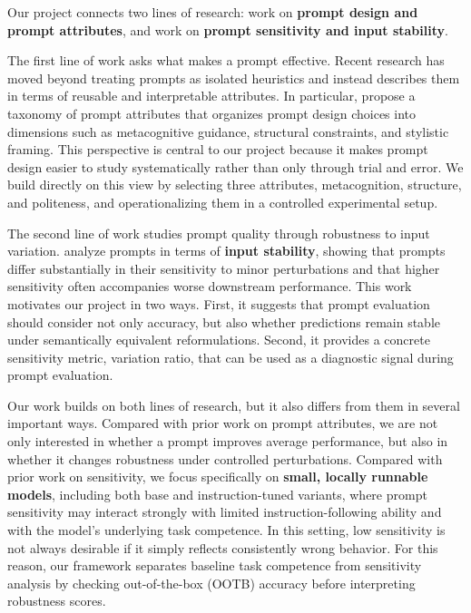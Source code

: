 \documentclass[11pt]{article}
\begin{document}
Our project connects two lines of research: work on \textbf{prompt design and prompt attributes}, and work on \textbf{prompt sensitivity and input stability}.

The first line of work asks what makes a prompt effective. Recent research has moved beyond treating prompts as isolated heuristics and instead describes them in terms of reusable and interpretable attributes. In particular, \citet{long-etal-2025-makes} propose a taxonomy of prompt attributes that organizes prompt design choices into dimensions such as metacognitive guidance, structural constraints, and stylistic framing. This perspective is central to our project because it makes prompt design easier to study systematically rather than only through trial and error. We build directly on this view by selecting three attributes, metacognition, structure, and politeness, and operationalizing them in a controlled experimental setup.

The second line of work studies prompt quality through robustness to input variation. \citet{lu-etal-2024-prompts} analyze prompts in terms of \textbf{input stability}, showing that prompts differ substantially in their sensitivity to minor perturbations and that higher sensitivity often accompanies worse downstream performance. This work motivates our project in two ways. First, it suggests that prompt evaluation should consider not only accuracy, but also whether predictions remain stable under semantically equivalent reformulations. Second, it provides a concrete sensitivity metric, variation ratio, that can be used as a diagnostic signal during prompt evaluation.

Our work builds on both lines of research, but it also differs from them in several important ways. Compared with prior work on prompt attributes, we are not only interested in whether a prompt improves average performance, but also in whether it changes robustness under controlled perturbations. Compared with prior work on sensitivity, we focus specifically on \textbf{small, locally runnable models}, including both base and instruction-tuned variants, where prompt sensitivity may interact strongly with limited instruction-following ability and with the model's underlying task competence. In this setting, low sensitivity is not always desirable if it simply reflects consistently wrong behavior. For this reason, our framework separates baseline task competence from sensitivity analysis by checking out-of-the-box (OOTB) accuracy before interpreting robustness scores.
\end{document}
